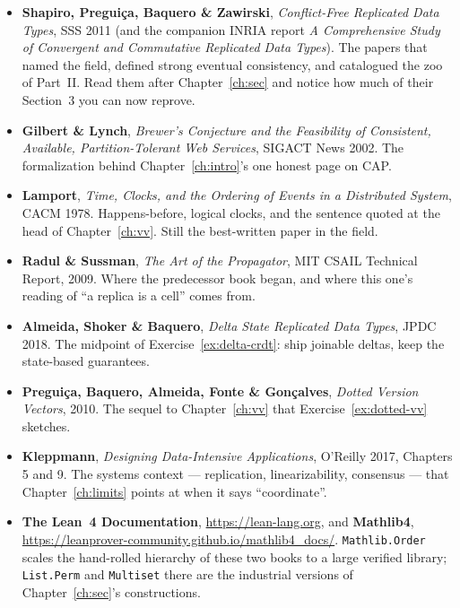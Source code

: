 \documentclass[12pt, a4paper, openright]{book}
\theoremstyle{thmstyle}
\theoremstyle{defstyle}
\newcommand{\lc}[1]{\texttt{#1}}
\begin{document}
\begin{itemize}
  \item \textbf{Shapiro, Preguiça, Baquero \& Zawirski},
    \emph{Conflict-Free Replicated Data Types}, SSS 2011 (and the
    companion INRIA report \emph{A Comprehensive Study of Convergent and
    Commutative Replicated Data Types}). The papers that named the field,
    defined strong eventual consistency, and catalogued the zoo of
    Part~II. Read them after Chapter~\ref{ch:sec} and notice how much of
    their Section~3 you can now reprove.

  \item \textbf{Gilbert \& Lynch}, \emph{Brewer's Conjecture and the
    Feasibility of Consistent, Available, Partition-Tolerant Web
    Services}, SIGACT News 2002. The formalization behind
    Chapter~\ref{ch:intro}'s one honest page on CAP.

  \item \textbf{Lamport}, \emph{Time, Clocks, and the Ordering of Events
    in a Distributed System}, CACM 1978. Happens-before, logical clocks,
    and the sentence quoted at the head of Chapter~\ref{ch:vv}. Still
    the best-written paper in the field.

  \item \textbf{Radul \& Sussman}, \emph{The Art of the Propagator},
    MIT CSAIL Technical Report, 2009. Where the predecessor book began,
    and where this one's reading of ``a replica is a cell'' comes from.

  \item \textbf{Almeida, Shoker \& Baquero}, \emph{Delta State
    Replicated Data Types}, JPDC 2018. The midpoint of
    Exercise~\ref{ex:delta-crdt}: ship joinable deltas, keep the
    state-based guarantees.

  \item \textbf{Preguiça, Baquero, Almeida, Fonte \& Gonçalves},
    \emph{Dotted Version Vectors}, 2010. The sequel to
    Chapter~\ref{ch:vv} that Exercise~\ref{ex:dotted-vv} sketches.

  \item \textbf{Kleppmann}, \emph{Designing Data-Intensive
    Applications}, O'Reilly 2017, Chapters 5 and 9. The systems context
    --- replication, linearizability, consensus --- that
    Chapter~\ref{ch:limits} points at when it says ``coordinate''.

  \item \textbf{The Lean~4 Documentation}, \url{https://lean-lang.org},
    and \textbf{Mathlib4},
    \url{https://leanprover-community.github.io/mathlib4_docs/}.
    \texttt{Mathlib.Order} scales the hand-rolled hierarchy of these two
    books to a large verified library; \lc{List.Perm} and
    \lc{Multiset} there are the industrial versions of
    Chapter~\ref{ch:sec}'s constructions.
\end{itemize}
\end{document}
